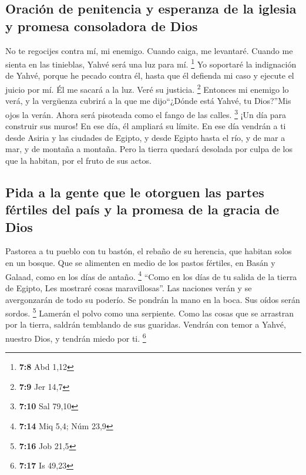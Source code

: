 \hypertarget{oraciuxf3n-de-penitencia-y-esperanza-de-la-iglesia-y-promesa-consoladora-de-dios}{%
\subsection{Oración de penitencia y esperanza de la iglesia y promesa
consoladora de
Dios}\label{oraciuxf3n-de-penitencia-y-esperanza-de-la-iglesia-y-promesa-consoladora-de-dios}}

 No te regocijes contra mí, mi enemigo. Cuando caiga, me
levantaré. Cuando me sienta en las tinieblas, Yahvé será una luz para
mí. \footnote{\textbf{7:8} Abd 1,12}  Yo soportaré la
indignación de Yahvé, porque he pecado contra él, hasta que él defienda
mi caso y ejecute el juicio por mí. Él me sacará a la luz. Veré su
justicia. \footnote{\textbf{7:9} Jer 14,7}  Entonces mi
enemigo lo verá, y la vergüenza cubrirá a la que me dijo``¿Dónde está
Yahvé, tu Dios?''Mis ojos la verán. Ahora será pisoteada como el fango
de las calles. \footnote{\textbf{7:10} Sal 79,10}  ¡Un
día para construir sus muros! En ese día, él ampliará su límite.
 En ese día vendrán a ti desde Asiria y las ciudades de
Egipto, y desde Egipto hasta el río, y de mar a mar, y de montaña a
montaña.  Pero la tierra quedará desolada por culpa de
los que la habitan, por el fruto de sus actos.

\hypertarget{pida-a-la-gente-que-le-otorguen-las-partes-fuxe9rtiles-del-pauxeds-y-la-promesa-de-la-gracia-de-dios}{%
\subsection{Pida a la gente que le otorguen las partes fértiles del país
y la promesa de la gracia de
Dios}\label{pida-a-la-gente-que-le-otorguen-las-partes-fuxe9rtiles-del-pauxeds-y-la-promesa-de-la-gracia-de-dios}}

 Pastorea a tu pueblo con tu bastón, el rebaño de su
herencia, que habitan solos en un bosque. Que se alimenten en medio de
los pastos fértiles, en Basán y Galaad, como en los días de antaño.
\footnote{\textbf{7:14} Miq 5,4; Núm 23,9}  ``Como en los
días de tu salida de la tierra de Egipto, Les mostraré cosas
maravillosas''.  Las naciones verán y se avergonzarán de
todo su poderío. Se pondrán la mano en la boca. Sus oídos serán sordos.
\footnote{\textbf{7:16} Job 21,5}  Lamerán el polvo como
una serpiente. Como las cosas que se arrastran por la tierra, saldrán
temblando de sus guaridas. Vendrán con temor a Yahvé, nuestro Dios, y
tendrán miedo por ti. \footnote{\textbf{7:17} Is 49,23}

